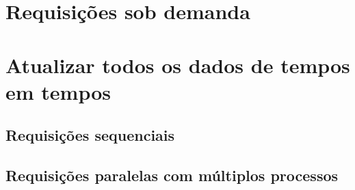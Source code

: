 \label{Cap:resultados}

\section{Requisições sob demanda}

\section{Atualizar todos os dados de tempos em tempos}

\subsection{Requisições sequenciais}

\subsection{Requisições paralelas com múltiplos processos}

